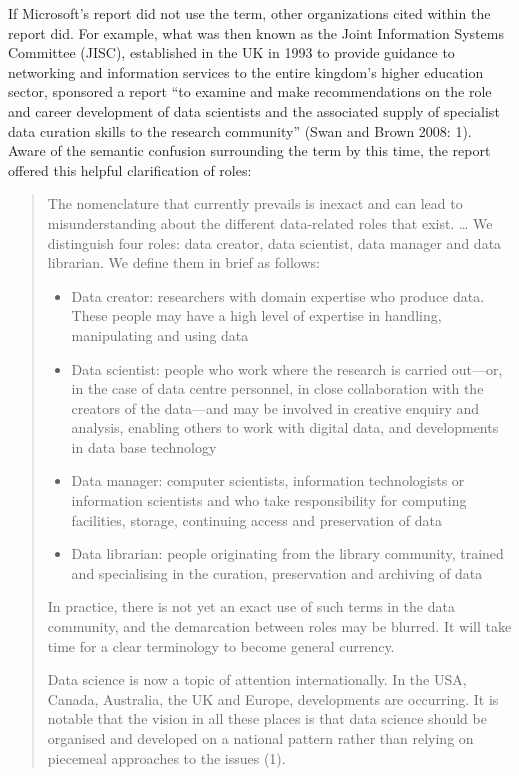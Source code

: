 \documentclass[
  letterpaper,
]{report}
\begin{document}
If Microsoft's report did not use the term, other organizations cited
within the report did. For example, what was then known as the Joint
Information Systems Committee (JISC), established in the UK in 1993 to
provide guidance to networking and information services to the entire
kingdom's higher education sector, sponsored a report ``to examine and
make recommendations on the role and career development of data
scientists and the associated supply of specialist data curation skills
to the research community'' (Swan and Brown 2008: 1). Aware of the
semantic confusion surrounding the term by this time, the report offered
this helpful clarification of roles:

\begin{quote}
The nomenclature that currently prevails is inexact and can lead to
misunderstanding about the different data-related roles that exist.
\ldots{} We distinguish four roles: data creator, data scientist, data
manager and data librarian. We define them in brief as follows:

\begin{itemize}
\item
  Data creator: researchers with domain expertise who produce data.
  These people may have a high level of expertise in handling,
  manipulating and using data
\item
  Data scientist: people who work where the research is carried
  out---or, in the case of data centre personnel, in close collaboration
  with the creators of the data---and may be involved in creative
  enquiry and analysis, enabling others to work with digital data, and
  developments in data base technology
\item
  Data manager: computer scientists, information technologists or
  information scientists and who take responsibility for computing
  facilities, storage, continuing access and preservation of data
\item
  Data librarian: people originating from the library community, trained
  and specialising in the curation, preservation and archiving of data
\end{itemize}

In practice, there is not yet an exact use of such terms in the data
community, and the demarcation between roles may be blurred. It will
take time for a clear terminology to become general currency.

Data science is now a topic of attention internationally. In the USA,
Canada, Australia, the UK and Europe, developments are occurring. It is
notable that the vision in all these places is that data science should
be organised and developed on a national pattern rather than relying on
piecemeal approaches to the issues (1).
\end{quote}
\end{document}
